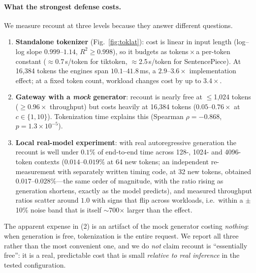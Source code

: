 \documentclass[11pt]{article}
\begin{document}
\paragraph{What the strongest defense costs.} We measure recount at three levels because
they answer different questions.
\begin{enumerate}\itemsep1pt
\item \textbf{Standalone tokenizer} (Fig.~\ref{fig:toklat}): cost is linear in input
length (log--log slope $0.999$--$1.14$, $R^2\ge0.998$), so it budgets as
tokens\,$\times$\,a per-token constant ($\approx$0.7\,\textmu s/token for tiktoken,
$\approx$2.5\,\textmu s/token for SentencePiece). At 16{,}384 tokens the engines span
$10.1$--$41.8$\,ms, a $2.9$--$3.6\times$ implementation effect; at a fixed token count,
workload changes cost by up to $3.4\times$.
\item \textbf{Gateway with a \emph{mock} generator}: recount is nearly free at
$\le$1{,}024 tokens ($\ge0.96\times$ throughput) but costs heavily at 16{,}384 tokens
($0.05$--$0.76\times$ at $c\!\in\!\{1,10\}$). Tokenization time explains this
(Spearman $\rho=-0.868$, $p=1.3\times10^{-5}$).
\item \textbf{Local real-model experiment}: with real autoregressive generation the
recount is well under $\mathbf{0.1\%}$ of end-to-end time across 128-, 1024- and
4096-token contexts ($0.014$--$0.019\%$ at 64 new tokens; an independent re-measurement
with separately written timing code, at 32 new tokens, obtained
$0.017$--$0.028\%$---the same order of magnitude, with the ratio rising as generation
shortens, exactly as the model predicts), and measured throughput ratios scatter around $1.0$ with signs
that flip across workloads, i.e.\ within a $\pm$10\% noise band that is itself
$\sim$700$\times$ larger than the effect.
\end{enumerate}
The apparent expense in (2) is an artifact of the mock generator costing \emph{nothing}:
when generation is free, tokenization is the entire request. We report all three rather
than the most convenient one, and we do \emph{not} claim recount is ``essentially free'':
it is a real, predictable cost that is small \emph{relative to real inference} in the
tested configuration.















\end{document}
